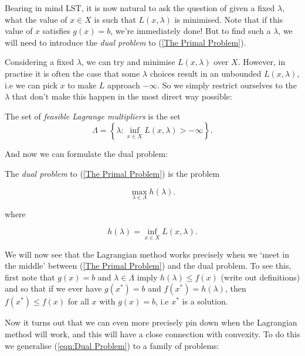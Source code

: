 \documentclass[11pt]{scrartcl}
\begin{document}
Bearing in mind LST, it is now natural to ask the question of given a fixed $\lambda$, what the value of $x \in X$ is such that $L(x, \lambda)$ is minimised. Note that if this value of $x$ satisfies $g(x)=b$, we're immediately done! But to find such a $\lambda$, we will need to introduce the \textit{dual problem} to (\ref{The Primal Problem}). 

Considering a fixed $\lambda$, we can try and minimise $L(x,\lambda)$ over $X$. However, in practise it is often the case that some $\lambda$ choices result in an unbounded $L(x,\lambda)$, i.e we can pick $x$ to make $L$ approach $- \infty$. So we simply restrict ourselves to the $\lambda$ that don't make this happen in the most direct way possible:

\begin{definition}
The set of \emph{feasible Lagrange multipliers} is the set
\begin{equation}
    \Lambda = \left\{ \lambda : \inf_{x \in X} L(x, \lambda) > - \infty \right\}.
    \label{eqn:Lambda}
\end{equation}
\end{definition}
 
And now we can formulate the dual problem:

\begin{definition}
The \emph{dual problem} to (\ref{The Primal Problem}) is the problem

\begin{equation}
    \max_{\lambda \in \Lambda} h(\lambda).
    \label{eqn:Dual Problem}
\end{equation}

where

\begin{equation}
    h(\lambda) = \inf_{x \in X} L(x, \lambda).
    \label{eqn:Dual Objective}
\end{equation}
\end{definition}
 
We will now see that the Lagrangian method works precisely when we `meet in the middle' between (\ref{The Primal Problem}) and the dual problem. To see this, first note that $g(x)=b$ and $\lambda \in \Lambda$ imply $h(\lambda) \le f(x)$ (write out definitions) and so that if we ever have $g(x^*) = b$ and $f(x^*) = h(\lambda)$, then $f(x^*) \le f(x)$ for all $x$ with $g(x)=b$, i.e $x^*$ is a solution.

Now it turns out that we can even more precisely pin down when the Lagrangian method will work, and this will have a close connection with convexity. To do this we generalise (\ref{eqn:Dual Problem}) to a family of problems:
\end{document}
